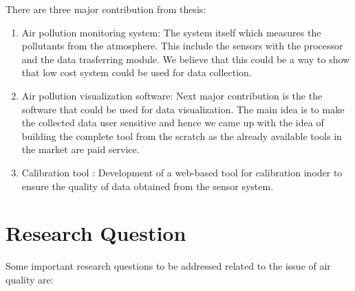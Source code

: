 There are three major contribution from thesis:
\begin{enumerate}
  
    \item Air pollution monitoring system: The system itself which measures the pollutants from the atmosphere. This include the sensors with the processor and the data trasferring module. We believe that this could be a way to show that low cost system could be used for data collection.
    
    \item  Air pollution visualization software: Next major contribution is the the software that could be used for data visualization. The main idea is to make the collected data user sensitive and hence we came up with the idea of building the complete tool from the scratch as the already available tools in the market are paid service. 
    
    \item Calibration tool : Development of a web-based tool for calibration inoder to ensure the quality of data obtained from the sensor system.
    
  
\end{enumerate}


\section{Research Question}
 
 Some important research questions to be addressed related to the issue of air quality are: 

